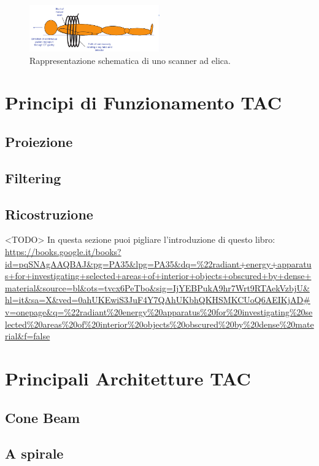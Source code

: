 \documentclass[a4paper,12pt, doubleside]{report}
\begin{document}
                    \begin{figure}[h]
                        \centering
                        \includegraphics[width=0.5\textwidth]{helix}
                        \caption{Rappresentazione schematica di uno scanner ad elica.}
                        \label{fig:helix}
                    \end{figure}
                                            
        \section{Principi di Funzionamento TAC}
            \subsection{Proiezione}
            \subsection{Filtering}
            \subsection{Ricostruzione}
                <TODO>
                In questa sezione puoi pigliare l'introduzione di questo libro:
                \url{https://books.google.it/books?id=pqSNAgAAQBAJ&pg=PA35&lpg=PA35&dq=%22radiant+energy+apparatus+for+investigating+selected+areas+of+interior+objects+obscured+by+dense+material&source=bl&ots=tvcx6PeTbo&sig=IjYEBPukA9hr7Wrt9RTAekVzbjU&hl=it&sa=X&ved=0ahUKEwiS3JuF4Y7QAhUKbhQKHSMKCUoQ6AEIKjAD#v=onepage&q=%22radiant%20energy%20apparatus%20for%20investigating%20selected%20areas%20of%20interior%20objects%20obscured%20by%20dense%20material&f=false}
           
            
        \section{Principali Architetture TAC}
            \subsection{Cone Beam}
            \subsection{A spirale}
\end{document}
